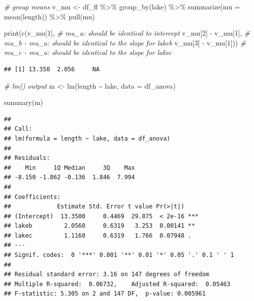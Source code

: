 \documentclass[
]{book}
\newenvironment{Shaded}{\begin{snugshade}}{\end{snugshade}}
\newcommand{\AttributeTok}[1]{\textcolor[rgb]{0.77,0.63,0.00}{#1}}
\newcommand{\CommentTok}[1]{\textcolor[rgb]{0.56,0.35,0.01}{\textit{#1}}}
\newcommand{\DecValTok}[1]{\textcolor[rgb]{0.00,0.00,0.81}{#1}}
\newcommand{\FunctionTok}[1]{\textcolor[rgb]{0.00,0.00,0.00}{#1}}
\newcommand{\NormalTok}[1]{#1}
\newcommand{\OtherTok}[1]{\textcolor[rgb]{0.56,0.35,0.01}{#1}}
\newcommand{\SpecialCharTok}[1]{\textcolor[rgb]{0.00,0.00,0.00}{#1}}
\begin{document}
\begin{Shaded}
\begin{Highlighting}[]
\CommentTok{\# group means}
\NormalTok{v\_mu }\OtherTok{\textless{}{-}}\NormalTok{ df\_fl }\SpecialCharTok{\%\textgreater{}\%} 
  \FunctionTok{group\_by}\NormalTok{(lake) }\SpecialCharTok{\%\textgreater{}\%} 
  \FunctionTok{summarize}\NormalTok{(}\AttributeTok{mu =} \FunctionTok{mean}\NormalTok{(length)) }\SpecialCharTok{\%\textgreater{}\%} 
  \FunctionTok{pull}\NormalTok{(mu)}

\FunctionTok{print}\NormalTok{(}\FunctionTok{c}\NormalTok{(v\_mu[}\DecValTok{1}\NormalTok{], }\CommentTok{\# mu\_a: should be identical to intercept}
\NormalTok{        v\_mu[}\DecValTok{2}\NormalTok{] }\SpecialCharTok{{-}}\NormalTok{ v\_mu[}\DecValTok{1}\NormalTok{], }\CommentTok{\# mu\_b {-} mu\_a: should be identical to the slope for lakeb}
\NormalTok{        v\_mu[}\DecValTok{3}\NormalTok{] }\SpecialCharTok{{-}}\NormalTok{ v\_mu[}\DecValTok{1}\NormalTok{])) }\CommentTok{\# mu\_c {-} mu\_a: should be identical to the slope for lakec}
\end{Highlighting}
\end{Shaded}

\begin{verbatim}
## [1] 13.350  2.056     NA
\end{verbatim}

\begin{Shaded}
\begin{Highlighting}[]
\CommentTok{\# lm() output}
\NormalTok{m }\OtherTok{\textless{}{-}} \FunctionTok{lm}\NormalTok{(length }\SpecialCharTok{\textasciitilde{}}\NormalTok{ lake,}
        \AttributeTok{data =}\NormalTok{ df\_anova)}

\FunctionTok{summary}\NormalTok{(m)}
\end{Highlighting}
\end{Shaded}

\begin{verbatim}
## 
## Call:
## lm(formula = length ~ lake, data = df_anova)
## 
## Residuals:
##    Min     1Q Median     3Q    Max 
## -8.150 -1.862 -0.136  1.846  7.994 
## 
## Coefficients:
##             Estimate Std. Error t value Pr(>|t|)    
## (Intercept)  13.3500     0.4469  29.875  < 2e-16 ***
## lakeb         2.0560     0.6319   3.253  0.00141 ** 
## lakec         1.1160     0.6319   1.766  0.07948 .  
## ---
## Signif. codes:  0 '***' 0.001 '**' 0.01 '*' 0.05 '.' 0.1 ' ' 1
## 
## Residual standard error: 3.16 on 147 degrees of freedom
## Multiple R-squared:  0.06732,    Adjusted R-squared:  0.05463 
## F-statistic: 5.305 on 2 and 147 DF,  p-value: 0.005961
\end{verbatim}
\end{document}
